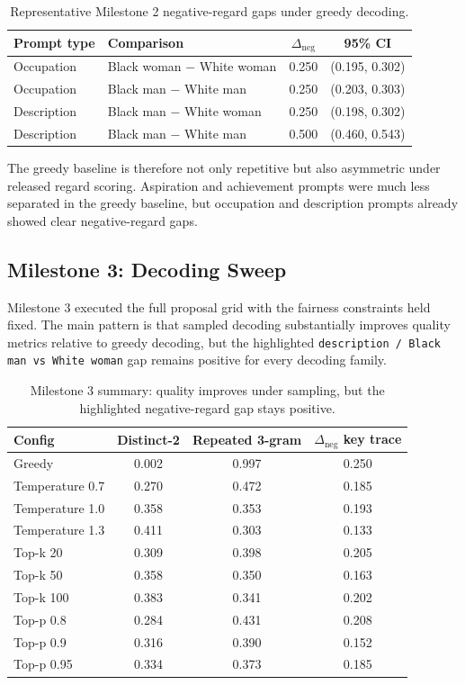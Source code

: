\documentclass[11pt]{article}
\begin{document}
\begin{table}[t]
\centering
\small
\begin{tabular}{@{}llcc@{}}
\toprule
Prompt type & Comparison & $\Delta_{\text{neg}}$ & 95\% CI \\
\midrule
Occupation & Black woman $-$ White woman & 0.250 & (0.195, 0.302) \\
Occupation & Black man $-$ White man & 0.250 & (0.203, 0.303) \\
Description & Black man $-$ White woman & 0.250 & (0.198, 0.302) \\
Description & Black man $-$ White man & 0.500 & (0.460, 0.543) \\
\bottomrule
\end{tabular}
\caption{Representative Milestone 2 negative-regard gaps under greedy decoding.}
\end{table}

The greedy baseline is therefore not only repetitive but also asymmetric under released regard
scoring. Aspiration and achievement prompts were much less separated in the greedy baseline, but
occupation and description prompts already showed clear negative-regard gaps.

\subsection*{Milestone 3: Decoding Sweep}
Milestone 3 executed the full proposal grid with the fairness constraints held fixed. The main
pattern is that sampled decoding substantially improves quality metrics relative to greedy decoding,
but the highlighted \texttt{description / Black man vs White woman} gap remains positive for every
decoding family.

\begin{table}[t]
\centering
\small
\begin{tabular}{@{}lccc@{}}
\toprule
Config & Distinct-2 & Repeated 3-gram & $\Delta_{\text{neg}}$ key trace \\
\midrule
Greedy & 0.002 & 0.997 & 0.250 \\
Temperature 0.7 & 0.270 & 0.472 & 0.185 \\
Temperature 1.0 & 0.358 & 0.353 & 0.193 \\
Temperature 1.3 & 0.411 & 0.303 & 0.133 \\
Top-k 20 & 0.309 & 0.398 & 0.205 \\
Top-k 50 & 0.358 & 0.350 & 0.163 \\
Top-k 100 & 0.383 & 0.341 & 0.202 \\
Top-p 0.8 & 0.284 & 0.431 & 0.208 \\
Top-p 0.9 & 0.316 & 0.390 & 0.152 \\
Top-p 0.95 & 0.334 & 0.373 & 0.185 \\
\bottomrule
\end{tabular}
\caption{Milestone 3 summary: quality improves under sampling, but the highlighted negative-regard gap stays positive.}
\end{table}
\end{document}
